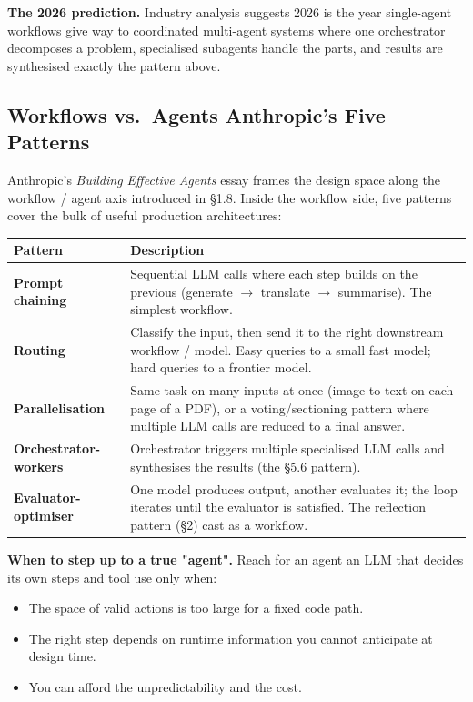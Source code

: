 \documentclass[a4paper,11pt]{article}
\begin{document}
\textbf{The 2026 prediction.} Industry analysis suggests 2026 is the
year single-agent workflows give way to coordinated multi-agent
systems where one orchestrator decomposes a problem, specialised
subagents handle the parts, and results are synthesised \textemdash{}
exactly the pattern above.

\subsection{Workflows vs.\ Agents \textemdash{} Anthropic's Five Patterns}

Anthropic's \textit{Building Effective Agents} essay frames the
design space along the workflow / agent axis introduced in §1.8.
Inside the workflow side, five patterns cover the bulk of useful
production architectures:

\begin{center}\small
\begin{tabular}{p{3.5cm} p{9.5cm}}
  \toprule
  \textbf{Pattern} & \textbf{Description} \\
  \midrule
  \textbf{Prompt chaining} &
    Sequential LLM calls where each step builds on the previous
    (generate $\to$ translate $\to$ summarise). The simplest workflow. \\[0.4em]
  \textbf{Routing} &
    Classify the input, then send it to the right downstream
    workflow / model. Easy queries to a small fast model; hard
    queries to a frontier model. \\[0.4em]
  \textbf{Parallelisation} &
    Same task on many inputs at once (image-to-text on each page of
    a PDF), or a voting/sectioning pattern where multiple LLM calls
    are reduced to a final answer. \\[0.4em]
  \textbf{Orchestrator-workers} &
    Orchestrator triggers multiple specialised LLM calls and
    synthesises the results (the §5.6 pattern). \\[0.4em]
  \textbf{Evaluator-optimiser} &
    One model produces output, another evaluates it; the loop
    iterates until the evaluator is satisfied. The reflection
    pattern (§2) cast as a workflow. \\
  \bottomrule
\end{tabular}
\end{center}

\textbf{When to step up to a true "agent".} Reach for an agent
\textemdash{} an LLM that decides its own steps and tool use
\textemdash{} only when:

\begin{itemize}[noitemsep, leftmargin=1.2em]
  \item The space of valid actions is too large for a fixed code
        path.
  \item The right step depends on runtime information you cannot
        anticipate at design time.
  \item You can afford the unpredictability and the cost.
\end{itemize}
\end{document}
